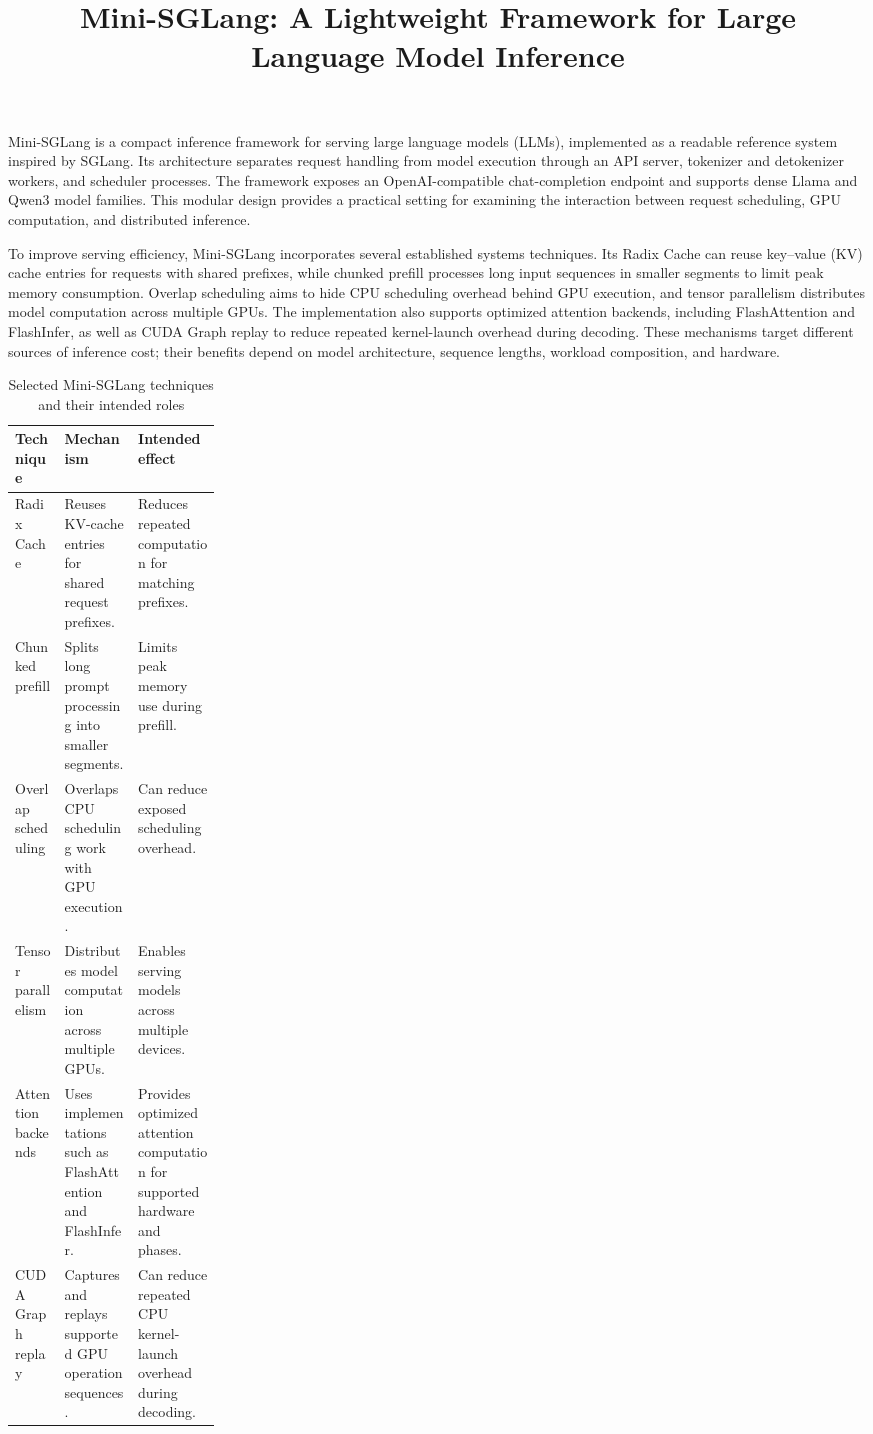 \documentclass[12pt,a4paper]{article}
\title{Mini-SGLang: A Lightweight Framework for Large Language Model Inference}
\author{}
\date{}
\begin{document}
\maketitle

Mini-SGLang is a compact inference framework for serving large language models (LLMs), implemented as a readable reference system inspired by SGLang. Its architecture separates request handling from model execution through an API server, tokenizer and detokenizer workers, and scheduler processes. The framework exposes an OpenAI-compatible chat-completion endpoint and supports dense Llama and Qwen3 model families. This modular design provides a practical setting for examining the interaction between request scheduling, GPU computation, and distributed inference.

To improve serving efficiency, Mini-SGLang incorporates several established systems techniques. Its Radix Cache can reuse key--value (KV) cache entries for requests with shared prefixes, while chunked prefill processes long input sequences in smaller segments to limit peak memory consumption. Overlap scheduling aims to hide CPU scheduling overhead behind GPU execution, and tensor parallelism distributes model computation across multiple GPUs. The implementation also supports optimized attention backends, including FlashAttention and FlashInfer, as well as CUDA Graph replay to reduce repeated kernel-launch overhead during decoding. These mechanisms target different sources of inference cost; their benefits depend on model architecture, sequence lengths, workload composition, and hardware.

\begin{table}[htbp]
\centering
\caption{Selected Mini-SGLang techniques and their intended roles}
\label{tab:techniques}
\small
\begin{tabularx}{\linewidth}{>{\raggedright\arraybackslash}p{0.24\linewidth} X X}
\hline
\textbf{Technique} & \textbf{Mechanism} & \textbf{Intended effect} \\
\hline
Radix Cache & Reuses KV-cache entries for shared request prefixes. & Reduces repeated computation for matching prefixes. \\
Chunked prefill & Splits long prompt processing into smaller segments. & Limits peak memory use during prefill. \\
Overlap scheduling & Overlaps CPU scheduling work with GPU execution. & Can reduce exposed scheduling overhead. \\
Tensor parallelism & Distributes model computation across multiple GPUs. & Enables serving models across multiple devices. \\
Attention backends & Uses implementations such as FlashAttention and FlashInfer. & Provides optimized attention computation for supported hardware and phases. \\
CUDA Graph replay & Captures and replays supported GPU operation sequences. & Can reduce repeated CPU kernel-launch overhead during decoding. \\
\hline
\end{tabularx}
\end{table}
\end{document}
